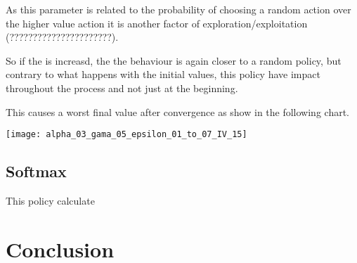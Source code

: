 \documentclass{article}
\begin{document}
As this parameter is related to the probability of choosing a random action over
the higher value action it is another factor of exploration/exploitation
(??????????????????????).

So if the \epsilon is increasd, the the behaviour is again closer to a random
policy, but contrary to what happens with the initial values, this policy have
impact throughout the process and not just at the beginning.

This causes a worst final value after convergence as show in the following
chart.

\texttt{[image: alpha\_03\_gama\_05\_epsilon\_01\_to\_07\_IV\_15]}

\subsection{Softmax}
\label{softmax}

This policy calculate 


\section{Conclusion}
\end{document}
